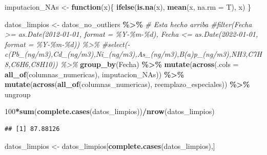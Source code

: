 \documentclass[notspecified,article,submit,moreauthors,pdftex]{Definitions/mdpi}
\newenvironment{Shaded}{\begin{snugshade}}{\end{snugshade}}
\newcommand{\AttributeTok}[1]{\textcolor[rgb]{0.13,0.29,0.53}{#1}}
\newcommand{\CommentTok}[1]{\textcolor[rgb]{0.56,0.35,0.01}{\textit{#1}}}
\newcommand{\ControlFlowTok}[1]{\textcolor[rgb]{0.13,0.29,0.53}{\textbf{#1}}}
\newcommand{\DecValTok}[1]{\textcolor[rgb]{0.00,0.00,0.81}{#1}}
\newcommand{\FunctionTok}[1]{\textcolor[rgb]{0.13,0.29,0.53}{\textbf{#1}}}
\newcommand{\NormalTok}[1]{#1}
\newcommand{\OtherTok}[1]{\textcolor[rgb]{0.56,0.35,0.01}{#1}}
\newcommand{\SpecialCharTok}[1]{\textcolor[rgb]{0.81,0.36,0.00}{\textbf{#1}}}
\begin{document}
\begin{Shaded}
\begin{Highlighting}[]
\NormalTok{imputacion\_NAs }\OtherTok{\textless{}{-}} \ControlFlowTok{function}\NormalTok{(x)\{}
  \FunctionTok{ifelse}\NormalTok{(}\FunctionTok{is.na}\NormalTok{(x), }\FunctionTok{mean}\NormalTok{(x, }\AttributeTok{na.rm =}\NormalTok{ T), x)}
\NormalTok{\}}

\NormalTok{datos\_limpios }\OtherTok{\textless{}{-}}\NormalTok{ datos\_no\_outliers }\SpecialCharTok{\%\textgreater{}\%} 
  \CommentTok{\# Esta hecho arriba}
  \CommentTok{\#filter(Fecha \textgreater{}= as.Date(\textquotesingle{}2012{-}01{-}01\textquotesingle{}, format = \textquotesingle{}\%Y{-}\%m{-}\%d\textquotesingle{}), Fecha \textless{}= as.Date(\textquotesingle{}2022{-}01{-}01\textquotesingle{}, format = \textquotesingle{}\%Y{-}\%m{-}\%d\textquotesingle{})) \%\textgreater{}\%}
  \CommentTok{\#select({-}c(\textquotesingle{}Pb\_(ng/m3)\textquotesingle{},\textquotesingle{}Cd\_(ng/m3)\textquotesingle{},\textquotesingle{}Ni\_(ng/m3)\textquotesingle{},\textquotesingle{}As\_(ng/m3)\textquotesingle{},\textquotesingle{}B(a)p\_(ng/m3)\textquotesingle{},\textquotesingle{}NH3\textquotesingle{},\textquotesingle{}C7H8\textquotesingle{},\textquotesingle{}C6H6\textquotesingle{},\textquotesingle{}C8H10\textquotesingle{})) \%\textgreater{}\% }
  \FunctionTok{group\_by}\NormalTok{(Fecha) }\SpecialCharTok{\%\textgreater{}\%} 
  \FunctionTok{mutate}\NormalTok{(}\FunctionTok{across}\NormalTok{(}\AttributeTok{.cols =} \FunctionTok{all\_of}\NormalTok{(columnas\_numericas), imputacion\_NAs)) }\SpecialCharTok{\%\textgreater{}\%} 
  \FunctionTok{mutate}\NormalTok{(}\FunctionTok{across}\NormalTok{(}\FunctionTok{all\_of}\NormalTok{(columnas\_numericas), reemplazo\_especiales)) }\SpecialCharTok{\%\textgreater{}\%}
\NormalTok{  ungroup}

\DecValTok{100}\SpecialCharTok{*}\FunctionTok{sum}\NormalTok{(}\FunctionTok{complete.cases}\NormalTok{(datos\_limpios))}\SpecialCharTok{/}\FunctionTok{nrow}\NormalTok{(datos\_limpios)}
\end{Highlighting}
\end{Shaded}

\begin{verbatim}
## [1] 87.88126
\end{verbatim}

\begin{Shaded}
\begin{Highlighting}[]
\NormalTok{datos\_limpios }\OtherTok{\textless{}{-}}\NormalTok{ datos\_limpios[}\FunctionTok{complete.cases}\NormalTok{(datos\_limpios),]}
\end{Highlighting}
\end{Shaded}
\end{document}
